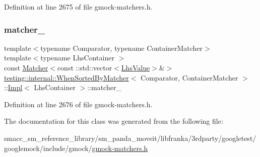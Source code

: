 Definition at line 2675 of file gmock-\/matchers.\+h.

\mbox{\label{classtesting_1_1internal_1_1WhenSortedByMatcher_1_1Impl_a4675b8bb38c5996ad8e570eafe4f72ea}} 
\subsubsection{\texorpdfstring{matcher\+\_\+}{matcher\_}}
{\footnotesize\ttfamily template$<$typename Comparator, typename Container\+Matcher$>$ \\
template$<$typename Lhs\+Container $>$ \\
const \hyperlink{classtesting_1_1Matcher}{Matcher}$<$const \+::std\+::vector$<$\hyperlink{classtesting_1_1internal_1_1WhenSortedByMatcher_1_1Impl_a93044f4ba53373fcfc424132b5e6c462}{Lhs\+Value}$>$\&$>$ \hyperlink{classtesting_1_1internal_1_1WhenSortedByMatcher}{testing\+::internal\+::\+When\+Sorted\+By\+Matcher}$<$ Comparator, Container\+Matcher $>$\+::\hyperlink{classtesting_1_1internal_1_1WhenSortedByMatcher_1_1Impl}{Impl}$<$ Lhs\+Container $>$\+::matcher\+\_\+\hspace{0.3cm}{\ttfamily [private]}}



Definition at line 2676 of file gmock-\/matchers.\+h.



The documentation for this class was generated from the following file\+:\begin{DoxyCompactItemize}
\item 
smacc\+\_\+sm\+\_\+reference\+\_\+library/sm\+\_\+panda\+\_\+moveit/libfranka/3rdparty/googletest/googlemock/include/gmock/\hyperlink{gmock-matchers_8h}{gmock-\/matchers.\+h}\end{DoxyCompactItemize}
